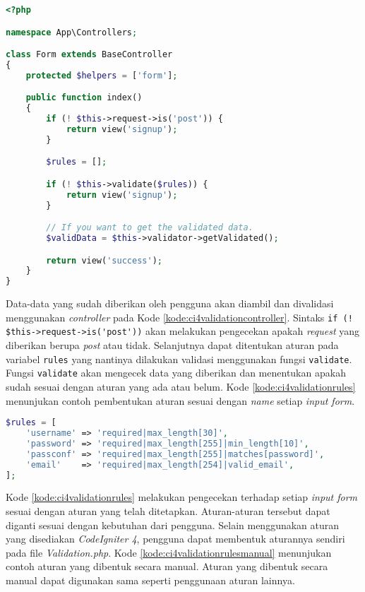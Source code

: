 \begin{lstlisting}[language=PHP, caption=Contoh kode untuk melakukan validasi data yang sudah dikumpulkan. ,label=kode:ci4validationcontroller]
<?php

namespace App\Controllers;

class Form extends BaseController
{
    protected $helpers = ['form'];

    public function index()
    {
        if (! $this->request->is('post')) {
            return view('signup');
        }

        $rules = [];

        if (! $this->validate($rules)) {
            return view('signup');
        }

        // If you want to get the validated data.
        $validData = $this->validator->getValidated();

        return view('success');
    }
}
\end{lstlisting}
Data-data yang sudah diberikan oleh pengguna akan diambil dan divalidasi menggunakan \textit{controller} pada Kode \ref{kode:ci4validationcontroller}. Sintaks \verb|if (! $this->request->is('post'))| akan melakukan pengecekan apakah \textit{request} yang diberikan berupa \textit{post} atau tidak. Selanjutnya dapat ditentukan aturan pada variabel \texttt{rules} yang nantinya dilakukan validasi menggunakan fungsi \texttt{validate}. Fungsi \texttt{validate} akan mengecek data yang diberikan dan menentukan apakah sudah sesuai dengan aturan yang ada atau belum. Kode \ref{kode:ci4validationrules} menunjukan contoh pembentukan aturan sesuai dengan \textit{name} setiap \textit{input form}.

\begin{lstlisting}[language=PHP, caption=Contoh kode untuk menetapkan aturan untuk validasi data yang sudah dikumpulkan. ,label=kode:ci4validationrules]
$rules = [
    'username' => 'required|max_length[30]',
    'password' => 'required|max_length[255]|min_length[10]',
    'passconf' => 'required|max_length[255]|matches[password]',
    'email'    => 'required|max_length[254]|valid_email',
];
\end{lstlisting}

Kode \ref{kode:ci4validationrules} melakukan pengecekan terhadap setiap \textit{input form} sesuai dengan aturan yang telah ditetapkan. Aturan-aturan tersebut dapat diganti sesuai dengan kebutuhan dari pengguna. Selain menggunakan aturan yang disediakan \textit{CodeIgniter 4}, pengguna dapat membentuk aturannya sendiri pada file \textit{Validation.php}. Kode \ref{kode:ci4validationrulesmanual} menunjukan contoh aturan yang dibentuk secara manual. Aturan yang dibentuk secara manual dapat digunakan sama seperti penggunaan aturan lainnya.

